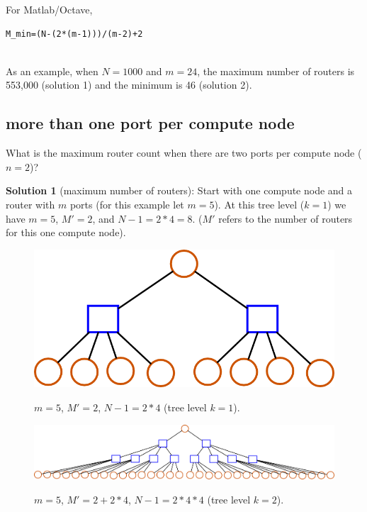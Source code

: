 \documentclass[pdftex]{article}
\begin{document}
For Matlab/Octave,
\begin{verbatim}
M_min=(N-(2*(m-1)))/(m-2)+2 
\end{verbatim}


\ \\
As an example, when $N=1000$ and $m=24$, the maximum number of routers is 553,000 (solution 1) and the minimum is 46 (solution 2).

\subsection{more than one port per compute node}
What is the maximum router count when there are two ports per compute node ($n=2$)? 

\textbf{Solution 1} (maximum number of routers): Start with one compute node and a router with $m$ ports (for this example let $m=5$). At this tree level ($k=1$) we have $m=5$, $M'=2$, and $N-1=2*4=8$. ($M'$ refers to the number of routers for this one compute node).


\begin{figure}[h!]
\begin{center}
\includegraphics[scale=0.3]{pictures/N9_n2_M2_m5_tree}
\label{fig:ngt1k1}
 \caption{$m=5$, $M'=2$, $N-1=2*4$ (tree level $k=1$). }
\end{center}
\end{figure}

\begin{figure}[h!]
\begin{center}
\includegraphics[scale=0.3]{pictures/N33_n2_M10_m5_tree}
\label{fig:ngt1k2}
 \caption{$m=5$, $M'=2+2*4$, $N-1=2*4*4$ (tree level $k=2$). }
\end{center}
\end{figure}
\end{document}
